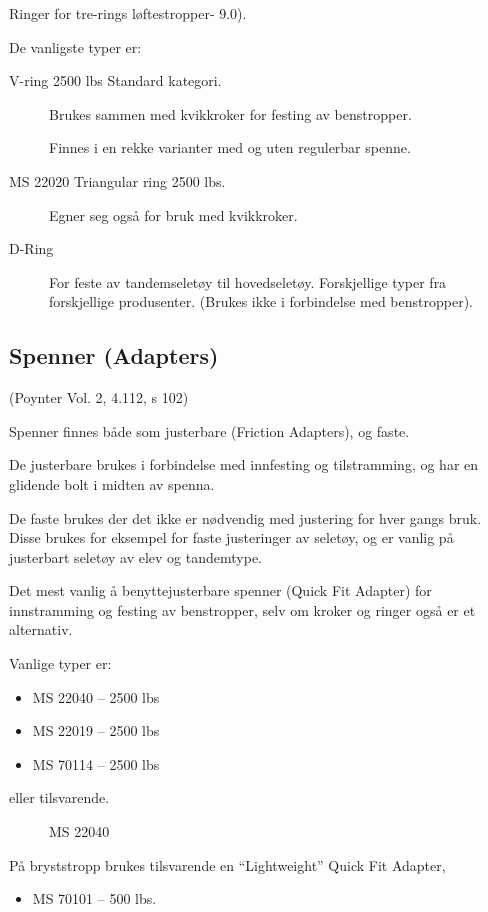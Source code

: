 Ringer for tre-rings løftestropper- 9.0).

De vanligste typer er:
\begin{description}
	\item[V-ring 2500 lbs Standard kategori.] Brukes sammen med kvikkroker for festing av benstropper.

	Finnes i en rekke varianter med og uten regulerbar spenne.
	\item[MS 22020 Triangular ring 2500 lbs.] Egner seg også for bruk med kvikkroker.
	\item[D-Ring] For feste av tandemseletøy til hovedseletøy. Forskjellige typer fra forskjellige produsenter. (Brukes ikke i forbindelse med benstropper).
\end{description}

\subsection{Spenner (Adapters)}
(Poynter Vol. 2, 4.112, s 102)

Spenner finnes både som justerbare (Friction Adapters), og faste.

De justerbare brukes i forbindelse med innfesting og tilstramming, og har en glidende bolt i midten av spenna.

De faste brukes der det ikke er nødvendig med justering for hver gangs bruk. Disse brukes for eksempel for faste justeringer av seletøy, og er vanlig på justerbart seletøy av elev og tandemtype.

Det mest vanlig å benyttejusterbare spenner (Quick Fit Adapter) for innstramming og festing av benstropper, selv om kroker og ringer også er et alternativ.

Vanlige typer er:
\begin{itemize}
	\item MS 22040 – 2500 lbs
	\item MS 22019 – 2500 lbs
	\item MS 70114 – 2500 lbs
\end{itemize}
eller tilsvarende.

\begin{figure}
	\caption{MS 22040}
\end{figure}

På bryststropp brukes tilsvarende en ``Lightweight'' Quick Fit Adapter,
\begin{itemize}
	\item MS 70101 – 500 lbs.
\end{itemize}

